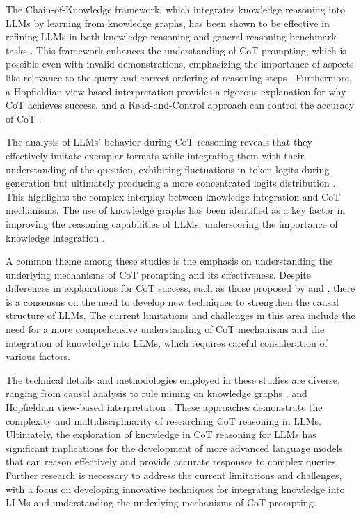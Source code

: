 \documentclass[conference]{IEEEtran}
\begin{document}
The Chain-of-Knowledge framework, which integrates knowledge reasoning into LLMs by learning from knowledge graphs, has been shown to be effective in refining LLMs in both knowledge reasoning and general reasoning benchmark tasks \cite{b2}. This framework enhances the understanding of CoT prompting, which is possible even with invalid demonstrations, emphasizing the importance of aspects like relevance to the query and correct ordering of reasoning steps \cite{b3}. Furthermore, a Hopfieldian view-based interpretation provides a rigorous explanation for why CoT achieves success, and a Read-and-Control approach can control the accuracy of CoT \cite{b4}.

The analysis of LLMs' behavior during CoT reasoning reveals that they effectively imitate exemplar formats while integrating them with their understanding of the question, exhibiting fluctuations in token logits during generation but ultimately producing a more concentrated logits distribution \cite{b5}. This highlights the complex interplay between knowledge integration and CoT mechanisms. The use of knowledge graphs has been identified as a key factor in improving the reasoning capabilities of LLMs, underscoring the importance of knowledge integration \cite{b2}.

A common theme among these studies is the emphasis on understanding the underlying mechanisms of CoT prompting and its effectiveness. Despite differences in explanations for CoT success, such as those proposed by \cite{b1} and \cite{b4}, there is a consensus on the need to develop new techniques to strengthen the causal structure of LLMs. The current limitations and challenges in this area include the need for a more comprehensive understanding of CoT mechanisms and the integration of knowledge into LLMs, which requires careful consideration of various factors.

The technical details and methodologies employed in these studies are diverse, ranging from causal analysis \cite{b1} to rule mining on knowledge graphs \cite{b2}, and Hopfieldian view-based interpretation \cite{b4}. These approaches demonstrate the complexity and multidisciplinarity of researching CoT reasoning in LLMs. Ultimately, the exploration of knowledge in CoT reasoning for LLMs has significant implications for the development of more advanced language models that can reason effectively and provide accurate responses to complex queries. Further research is necessary to address the current limitations and challenges, with a focus on developing innovative techniques for integrating knowledge into LLMs and understanding the underlying mechanisms of CoT prompting.
\end{document}
